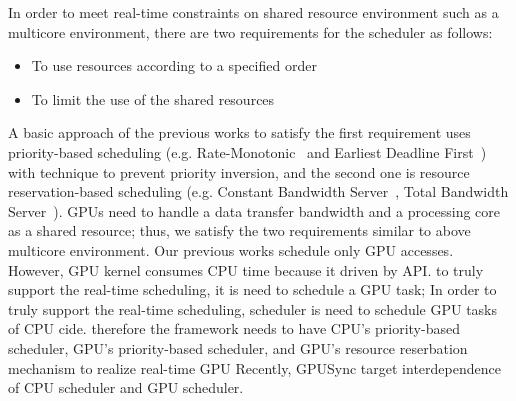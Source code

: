 In order to meet real-time constraints on shared resource environment such as a multicore environment,
there are two requirements for the scheduler as follows:
\begin{itemize}
\item To use resources according to a specified order
\item To limit the use of the shared resources
\end{itemize}
A basic approach of the previous works to satisfy the first requirement uses priority-based scheduling (e.g. Rate-Monotonic~\cite{sched:rm} and Earliest Deadline First~\cite{sched:edf}) with technique to prevent priority inversion,
and the second one is resource reservation-based scheduling (e.g. Constant Bandwidth Server~\cite{rr:cbs}, Total Bandwidth Server~\cite{rr:tbs2}).
GPUs need to handle a data transfer bandwidth and a processing core as a shared resource;
thus, we satisfy the two requirements similar to above multicore environment.
Our previous works schedule only GPU accesses. 
However, GPU kernel consumes CPU time because it driven by API.
to truly support  the real-time scheduling, it is need to schedule a GPU task;
In order to truly support the real-time scheduling, scheduler is need to schedule GPU tasks of CPU cide.
therefore the framework needs to have CPU's priority-based scheduler, GPU's priority-based scheduler, and GPU's resource reserbation mechanism to realize real-time GPU
Recently, GPUSync target interdependence of CPU scheduler and GPU scheduler.

